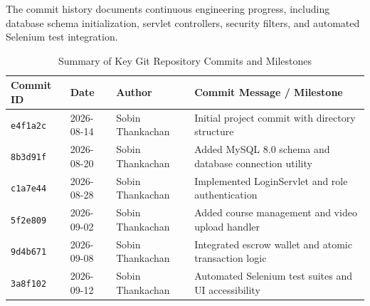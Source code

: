 \documentclass[12pt,a4paper]{report}
\begin{document}
The commit history documents continuous engineering progress, including database schema initialization, servlet controllers, security filters, and automated Selenium test integration.

\begin{table}[H]
\centering
\small
\caption{Summary of Key Git Repository Commits and Milestones}
\label{tab:git_commits}
\begin{tabularx}{\textwidth}{|L{2.0cm}|L{2.5cm}|L{3.2cm}|J|}
\hline
\textbf{Commit ID} & \textbf{Date} & \textbf{Author} & \textbf{Commit Message / Milestone} \\ \hline
\texttt{e4f1a2c} & 2026-08-14 & Sobin Thankachan & Initial project commit with directory structure \\ \hline
\texttt{8b3d91f} & 2026-08-20 & Sobin Thankachan & Added MySQL 8.0 schema and database connection utility \\ \hline
\texttt{c1a7e44} & 2026-08-28 & Sobin Thankachan & Implemented LoginServlet and role authentication \\ \hline
\texttt{5f2e809} & 2026-09-02 & Sobin Thankachan & Added course management and video upload handler \\ \hline
\texttt{9d4b671} & 2026-09-08 & Sobin Thankachan & Integrated escrow wallet and atomic transaction logic \\ \hline
\texttt{3a8f102} & 2026-09-12 & Sobin Thankachan & Automated Selenium test suites and UI accessibility \\ \hline
\end{tabularx}
\end{table}
\end{document}
